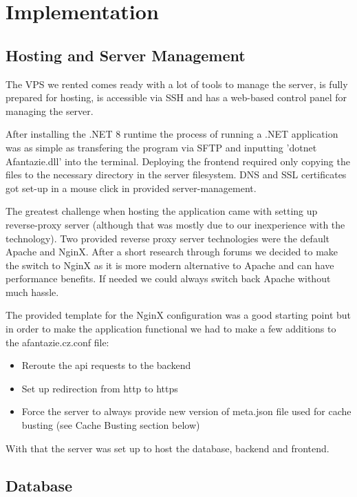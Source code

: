 \chapter{Implementation}

\section{Hosting and Server Management}

The VPS we rented comes ready with a lot of tools to manage the server, is fully prepared for hosting,
is accessible via SSH and has a web-based control panel for managing the server.

After installing the .NET 8 runtime the process of running a .NET application was as simple as transfering the program via SFTP
and inputting 'dotnet Afantazie.dll' into the terminal.
Deploying the frontend required only copying the files to the necessary directory in the server filesystem.
DNS and SSL certificates got set-up in a mouse click in provided server-management.

The greatest challenge when hosting the application came with setting up reverse-proxy server (although that was mostly due to our inexperience with the technology).
Two provided reverse proxy server technologies were the default Apache and NginX.
After a short research through forums we decided to make the switch to NginX as it is more modern alternative to Apache and can have performance benefits.
If needed we could always switch back Apache without much hassle.

The provided template for the NginX configuration was a good starting point but in order to make the
application functional we had to make a few additions to the afantazie.cz.conf file:
\begin{itemize}
    \item Reroute the api requests to the backend
    \item Set up redirection from http to https
    \item Force the server to always provide new version of meta.json file used for cache busting (see Cache Busting section below)
\end{itemize}

With that the server was set up to host the database, backend and frontend.

\section{Database}

